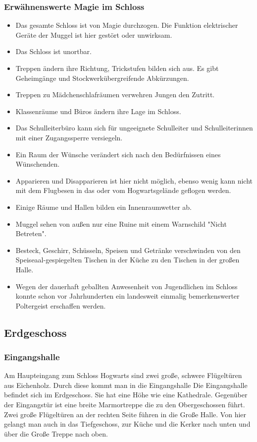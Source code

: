 \documentclass[a4paper, 10pt]{article}
\begin{document}
\subsubsection*{\large Erwähnenswerte Magie im Schloss}
\vspace{10pt}
\begin{itemize}
    \item Das gesamte Schloss ist von Magie durchzogen. Die Funktion elektrischer Geräte der Muggel ist hier gestört oder unwirksam.
    \item Das Schloss ist unortbar.
    \item Treppen ändern ihre Richtung, Trickstufen bilden sich aus. Es gibt Geheimgänge und Stockwerkübergreifende Abkürzungen.
    \item Treppen zu Mädchenschlafräumen verwehren Jungen den Zutritt.
    \item Klassenräume und Büros ändern ihre Lage im Schloss.
    \item Das Schulleiterbüro kann sich für ungeeignete Schulleiter und Schulleiterinnen mit einer Zugangssperre versiegeln.
    \item Ein Raum der Wünsche verändert sich nach den Bedürfnissen eines Wünschenden.
    \item Apparieren und Disapparieren ist hier nicht möglich, ebenso wenig kann nicht mit dem Flugbesen in das oder vom Hogwartsgelände geflogen werden.
    \item Einige Räume und Hallen bilden ein Innenraumwetter ab.
    \item Muggel sehen von außen nur eine Ruine mit einem Warnschild "Nicht Betreten".
    \item Besteck, Geschirr, Schüsseln, Speisen und Getränke verschwinden von den Speiseaal-gespiegelten Tischen in der Küche zu den Tischen in der großen Halle.
    \item Wegen der dauerhaft geballten Anwesenheit von Jugendlichen im Schloss konnte schon vor Jahrhunderten ein landesweit einmalig bemerkenswerter Poltergeist erschaffen werden.
\end{itemize}
\vspace{10pt}

\subsection*{\Large Erdgeschoss}
\subsubsection*{\large Eingangshalle}
Am Haupteingang zum Schloss Hogwarts sind zwei große, schwere Flügeltüren aus Eichenholz. Durch diese kommt man in die Eingangshalle Die Eingangshalle befindet sich im Erdgeschoss. Sie hat eine Höhe wie eine Kathedrale. Gegenüber der Eingangstür ist eine breite Marmortreppe die zu den Obergeschossen führt. Zwei große Flügeltüren an der rechten Seite führen in die Große Halle.  Von hier gelangt man auch in das Tiefgeschoss, zur Küche und die Kerker nach unten und über die Große Treppe nach oben.
\end{document}
